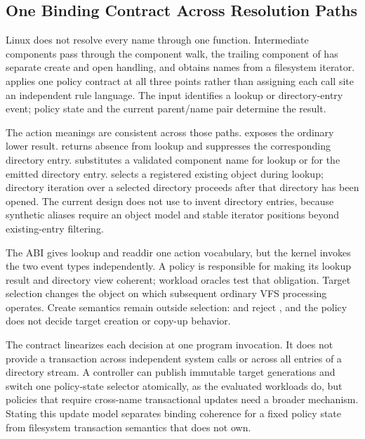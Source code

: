 \subsection{One Binding Contract Across Resolution Paths}

Linux does not resolve every name through one function. Intermediate
components pass through the component walk, the trailing component of
 has separate create and open handling, and 
obtains names from a filesystem iterator. \namei applies one policy contract at
all three points rather than assigning each call site an independent rule
language. The input identifies a lookup or directory-entry event; policy state
and the current parent/name pair determine the result.

The action meanings are consistent across those paths.  exposes the
ordinary lower result.  returns absence from lookup and suppresses
the corresponding directory entry.  substitutes a validated
component name for lookup or for the emitted directory entry.
 selects a registered existing object during lookup;
directory iteration over a selected directory proceeds after that directory
has been opened. The current design does not use  to invent
directory entries, because synthetic aliases require an object model and
stable iterator positions beyond existing-entry filtering.

The ABI gives lookup and readdir one action vocabulary, but the kernel invokes
the two event types independently. A policy is responsible for making its
lookup result and directory view coherent; workload oracles test that
obligation. Target selection changes the object on which subsequent ordinary
VFS processing operates. Create semantics remain outside selection:
 and  reject , and the
policy does not decide target creation or copy-up behavior.

The contract linearizes each decision at one program invocation. It does not
provide a transaction across independent system calls or across all entries of
a directory stream. A controller can publish immutable target generations and
switch one policy-state selector atomically, as the evaluated workloads do,
but policies that require cross-name transactional updates need a broader
mechanism. Stating this update model separates binding coherence for a fixed
policy state from filesystem transaction semantics that \namei does not own.

